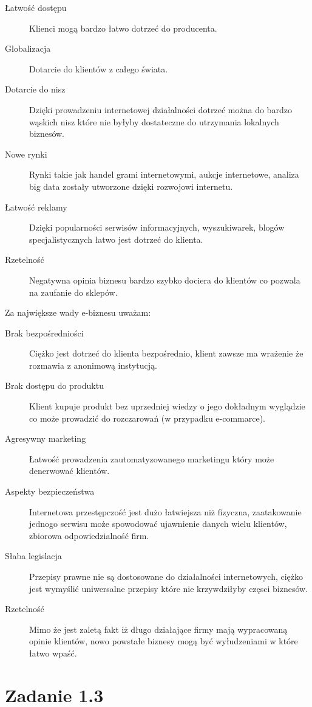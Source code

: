 \documentclass[paper=a4, fontsize=11pt]{scrartcl} %
\numberwithin{equation}{section} %
\numberwithin{figure}{section} %
\numberwithin{table}{section} %
\begin{document}
\begin{description}
  \item[Łatwość dostępu] Klienci mogą bardzo łatwo dotrzeć do producenta.  
  \item[Globalizacja] Dotarcie do klientów z całego świata.
  \item[Dotarcie do nisz] Dzięki prowadzeniu internetowej działalności dotrzeć można do bardzo wąskich nisz które nie byłyby dostateczne do utrzymania lokalnych biznesów.
  \item[Nowe rynki] Rynki takie jak handel grami internetowymi, aukcje internetowe, analiza big data zostały utworzone dzięki rozwojowi internetu.
  \item[Łatwość reklamy] Dzięki popularności serwisów informacyjnych, wyszukiwarek, blogów specjalistycznych łatwo jest dotrzeć do klienta.
  \item[Rzetelność] Negatywna opinia biznesu bardzo szybko dociera do klientów co pozwala na zaufanie do sklepów.
\end{description}

Za największe wady e-biznesu uważam:

\begin{description}
  \item[Brak bezpośredniości] Ciężko jest dotrzeć do klienta bezpośrednio, klient zawsze ma wrażenie że rozmawia z anonimową instytucją.
  \item[Brak dostępu do produktu] Klient kupuje produkt bez uprzedniej wiedzy o jego dokładnym wyglądzie co może prowadzić do rozczarowań (w przypadku e-commarce).
  \item[Agresywny marketing] Łatwość prowadzenia zautomatyzowanego marketingu który może denerwować klientów.
  \item[Aspekty bezpieczeństwa] Internetowa przestępczość jest dużo łatwiejsza niż fizyczna, zaatakowanie jednogo serwisu może spowodować ujawnienie danych wielu klientów, zbiorowa odpowiedzialność
    firm.
  \item[Słaba legislacja] Przepisy prawne nie są dostosowane do działalności internetowych, ciężko jest wymyślić uniwersalne przepisy które nie krzywdziłyby częsci biznesów.
  \item[Rzetelność] Mimo że jest zaletą fakt iż długo działające firmy mają wypracowaną opinie klientów, nowo powstałe biznesy mogą być wyłudzeniami w które łatwo wpaść.
\end{description}


\section{Zadanie 1.3}
\end{document}
